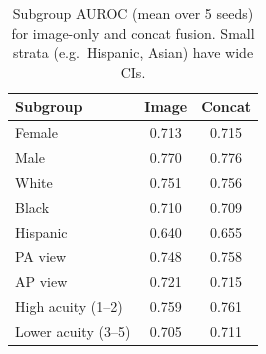 \documentclass[twocolumn, final]{svjour3}
\begin{document}
\begin{table}[t]
\centering
\caption{Subgroup AUROC (mean over 5 seeds) for image-only and concat fusion.
Small strata (e.g.\ Hispanic, Asian) have wide CIs.}
\label{tab:subgroup}
\begin{tabular}{@{}lcc@{}}
\toprule
Subgroup & Image & Concat \\
\midrule
Female            & 0.713 & 0.715 \\
Male              & 0.770 & 0.776 \\
White             & 0.751 & 0.756 \\
Black             & 0.710 & 0.709 \\
Hispanic          & 0.640 & 0.655 \\
PA view           & 0.748 & 0.758 \\
AP view           & 0.721 & 0.715 \\
High acuity (1--2)& 0.759 & 0.761 \\
Lower acuity (3--5)&0.705 & 0.711 \\
\bottomrule
\end{tabular}
\end{table}
\end{document}

